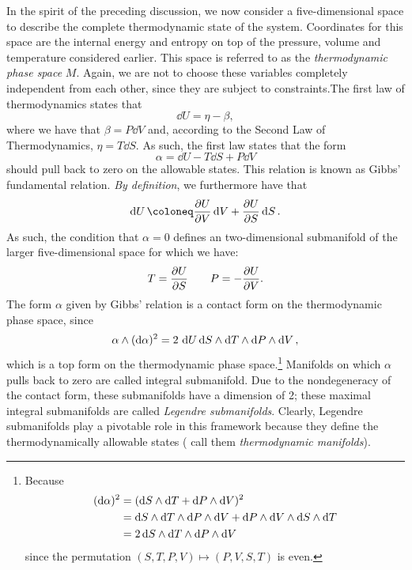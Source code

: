 In the spirit of the preceding discussion, we now consider a five-dimensional space to describe the complete thermodynamic state of the system. Coordinates for this space are the internal energy and entropy on top of the pressure, volume and temperature considered earlier. This space is referred to as the \emph{thermodynamic phase space} $M$. Again, we are not to choose these variables completely independent from each other, since they are subject to constraints.The first law of thermodynamics states that
$$ \dd{U} = \eta - \beta, $$
where we have that $ \beta = P\dd{V} $ and, according to the Second Law of Thermodynamics, $ \eta = T\dd{S} $. As such, the first law states that the form
\begin{equation} 
    \alpha = \dd{U} - T\dd{S} + P\dd{V}
    \label{eq:gibbs_relation}
\end{equation}
should pull back to zero on the allowable states. This relation is known as Gibbs' fundamental relation. \emph{By definition}, we furthermore have that
$$ \dd{U} \coloneq \pdv{U}{V}\dd{V} + \pdv{U}{S}\dd{S}.$$
As such, the condition that $\alpha = 0$ defines an two-dimensional submanifold of the larger five-dimensional space for which we have:
\begin{equation}
    T = \pdv{U}{S} \qquad P = -\pdv{U}{V}. 
\end{equation}
The form $\alpha$ given by Gibbs' relation is a contact form on the thermodynamic phase space, since
$$  \alpha\wedge(\dd{\alpha})^2  = 2\,\dd{U}  \dd{S}\wedge\dd{T} \wedge \dd{P}\wedge\dd{V}  , $$
which is a top form on the thermodynamic phase space.\footnote
{
    Because 
    \begin{equation*} 
        \begin{split}
            (\dd{\alpha})^2 &= ( \dd{S}\wedge\dd{T}  +  \dd{P}\wedge\dd{V} )^2 \\
                            &=   \dd{S}\wedge\dd{T} \wedge \dd{P}\wedge\dd{V}   +   \dd{P}\wedge\dd{V} \wedge \dd{S}\wedge\dd{T}   \\
                            &= 2  \dd{S}\wedge\dd{T} \wedge \dd{P}\wedge\dd{V}   \\
        \end{split}
    \end{equation*}
    since the permutation $ (S, T, P, V) \mapsto (P, V, S, T) $ is even.
}
Manifolds on which $\alpha$ pulls back to zero are called integral submanifold. Due to the nondegeneracy of the contact form, these submanifolds have a dimension of 2; these maximal integral submanifolds are called \emph{Legendre submanifolds}. Clearly, Legendre submanifolds play a pivotable role in this framework because they define the thermodynamically allowable states (\citet{Balian2001} call them \emph{thermodynamic manifolds}).

